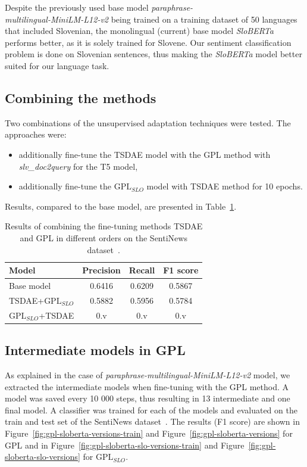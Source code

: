 \documentclass[fleqn,moreauthors,10pt]{ds_report}
\begin{document}
Despite the previously used base model {\it paraphrase-\\multilingual-MiniLM-L12-v2} being trained on a training dataset of 50 languages that included Slovenian, the monolingual (current) base model {\it SloBERTa} performs better, as it is solely trained for Slovene. Our sentiment classification problem is done on Slovenian sentences, thus making the {\it SloBERTa} model better suited for our language task.


\subsection*{Combining the methods}
Two combinations of the unsupervised adaptation techniques were tested. The approaches were:
\begin{itemize}
	\item additionally fine-tune the TSDAE model with the GPL method with {\it slv\_doc2query} for the T5 model,
	\item additionally fine-tune the $\text{GPL}_{SLO}$ model with TSDAE method for 10 epochs.
\end{itemize}
Results, compared to the base model, are presented in Table~\ref{tab5}.

\begin{table}[!h]
	\footnotesize
	\begin{center}
		\begin{tabular}{ |l|c|c|c| }
		\hline
		\rowcolor{Blue}Model & Precision & Recall & F1 score\\
		\hline

		Base model & 0.6416 & 0.6209 & 0.5867\\
		TSDAE+$\text{GPL}_{SLO}$ & 0.5882 & 0.5956 & 0.5784\\
		$\text{GPL}_{SLO}$+TSDAE & 0.v & 0.v & 0.v\\

		\hline
		\end{tabular}
	\end{center}
\caption{Results of combining the fine-tuning methods TSDAE and GPL in different orders on the SentiNews dataset~\cite{sentiNews}.}
\label{tab5}
\end{table}



\subsection*{Intermediate models in GPL}
As explained in the case of {\it paraphrase-multilingual-MiniLM-L12-v2} model, we extracted the intermediate models when fine-tuning with the GPL method. A model was saved every 10 000 steps, thus resulting in 13 intermediate and one final model. A classifier was trained for each of the models and evaluated on the train and test set of the SentiNews dataset~\cite{sentiNews}. The results (F1 score) are shown in Figure~\ref{fig:gpl-sloberta-versions-train} and Figure~\ref{fig:gpl-sloberta-versions} for GPL and in Figure~\ref{fig:gpl-sloberta-slo-versions-train} and Figure~\ref{fig:gpl-sloberta-slo-versions} for $\text{GPL}_{SLO}$.
\end{document}

